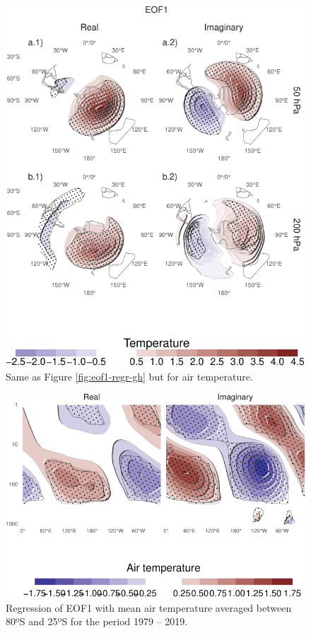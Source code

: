 \documentclass[smallextended]{svjour3}       %
\begin{document}
\begin{figure}
\centering
\includegraphics{../figures/eof1-regr-t-1.pdf}
\caption{\label{fig:eof1-regr-t}Same as Figure \ref{fig:eof1-regr-gh} but for air temperature.}
\end{figure}



\begin{figure}
\centering
\includegraphics{../figures/t-vertical-1.pdf}
\caption{\label{fig:t-vertical}Regression of EOF1 with mean air temperature averaged between 80ºS and 25ºS for the period 1979 -- 2019.}
\end{figure}
\end{document}
